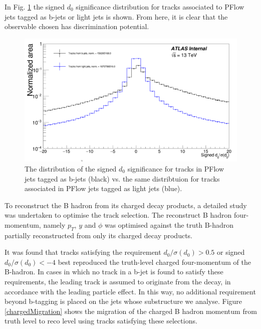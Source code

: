 \documentclass[10pt,a4paper]{book}
\begin{document}
In Fig. \ref{pflowD0} the signed $d_0$ significance distribution for tracks associated to PFlow jets tagged as b-jets or light jets is shown. From here, it is clear that the observable chosen has discrimination potential.

\begin{figure}
    \centering
    \includegraphics[width=\linewidth]{pflowD0}
    \caption{The distribution of the signed $d_0$ significance for tracks in PFlow jets tagged as b-jets (black) vs. the same distribtuion for tracks associated in PFlow jets tagged as light jets (blue).}
    \label{pflowD0}
\end{figure}

To reconstruct the B hadron from its charged decay products, a detailed study was undertaken to optimise the track selection. The reconstruct B hadron four-momentum, namely $p_T$, $y$ and $\phi$ was optimised against the truth B-hadron partially reconstructed from only its charged decay products. 

It was found that tracks satisfying the requirement $d_0/\sigma(d_0) > 0.5$ or signed $d_0/\sigma(d_0) < -4$ best reproduced the truth-level charged four-momentum of the B-hadron. In cases in which no track in a b-jet is found to satisfy these requirements, the leading track is assumed to originate from the decay, in accordance with the leading particle effect. In this way, no additional requirement beyond b-tagging is placed on the jets whose substructure we analyse. Figure \ref{chargedMigration} shows the migration of the charged B hadron momentum from truth level to reco level using tracks satisfying these selections.
\end{document}
